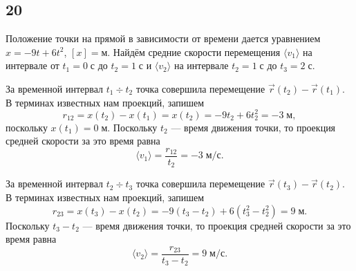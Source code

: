 \subsection{20}

Положение точки на прямой в зависимости от времени дается уравнением $x=-9t+6t^2$, $[x]=\text{м}$. Найдём средние скорости перемещения $\langle v_1\rangle$ на интервале от $t_1=0\;\text{с}$ до $t_2=1\;\text{с}$ и $\langle v_2\rangle$ на интервале $t_2=1\;\text{с}$ до $t_3=2\;\text{с}$.

За временной интервал $t_1\div t_2$ точка совершила перемещение $\vec r(t_2)-\vec r(t_1)$. В терминах известных нам проекций, запишем
\[
r_{12}=x(t_2)-x(t_1)=x(t_2)=-9t_2+6t_2^2=-3\;\text{м},
\]
поскольку $x(t_1)=0\;\text{м}$. Поскольку $t_2$ --- время движения точки, то проекция средней скорости за это время равна
\[
\langle v_1\rangle=\frac{r_{12}}{t_2}=-3\;\text{м/с}.
\]

За временной интервал $t_2\div t_3$ точка совершила перемещение $\vec r(t_3)-\vec r(t_2)$. В терминах известных нам проекций, запишем
\[
r_{23}=x(t_3)-x(t_2)=-9(t_3-t_2)+6(t_3^2-t_2^2)=9\;\text{м}.
\]
Поскольку $t_3-t_2$ --- время движения точки, то проекция средней скорости за это время равна
\[
\langle v_2\rangle=\frac{r_{23}}{t_3-t_2}=9\;\text{м/с}.
\]